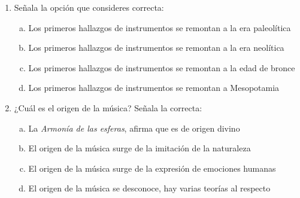 \documentclass[letterpaper,12pt,notitlepage,spanish]{article}
\begin{document}
%
%
\begin{ejercicio}[] %
	\begin{enumerate}[1.-]
%
%
		\item Señala la opción que consideres correcta:
%
		\begin{enumerate}[a)]
		\item Los primeros hallazgos de instrumentos se remontan a la era paleolítica
		\item Los primeros hallazgos de instrumentos se remontan a la era neolítica
		\item Los primeros hallazgos de instrumentos se remontan a la edad de bronce
		\item Los primeros hallazgos de instrumentos se remontan a Mesopotamia
		\end{enumerate}
%
%
%
		\item ¿Cuál es el origen de la música? Señala la correcta:
%		
	\begin{enumerate}[a)]
		\item La \textit{Armonía de las esferas}, afirma que es de origen divino
		\item El origen de la música surge de la imitación de la naturaleza
		\item El origen de la música surge de la expresión de emociones humanas
		\item El origen de la música se desconoce, hay varias teorías al respecto 
%
%		
	\end{enumerate}
\end{enumerate}
\end{ejercicio} %
%
%
%
\end{document}

